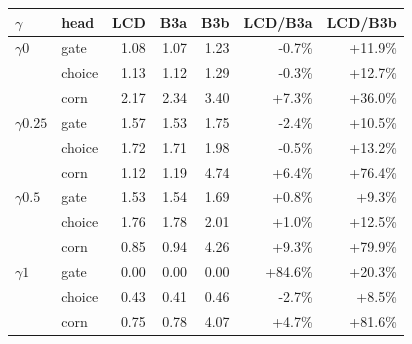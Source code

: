 \begin{tabular}{llrrrrr}
\toprule
$\gamma$ & head & LCD & B3a & B3b & LCD/B3a & LCD/B3b \\
\midrule
$\gamma0$ & gate & 1.08 & 1.07 & 1.23 & -0.7\% & +11.9\% \\
 & choice & 1.13 & 1.12 & 1.29 & -0.3\% & +12.7\% \\
 & corn & 2.17 & 2.34 & 3.40 & +7.3\% & +36.0\% \\
\addlinespace
$\gamma0.25$ & gate & 1.57 & 1.53 & 1.75 & -2.4\% & +10.5\% \\
 & choice & 1.72 & 1.71 & 1.98 & -0.5\% & +13.2\% \\
 & corn & 1.12 & 1.19 & 4.74 & +6.4\% & +76.4\% \\
\addlinespace
$\gamma0.5$ & gate & 1.53 & 1.54 & 1.69 & +0.8\% & +9.3\% \\
 & choice & 1.76 & 1.78 & 2.01 & +1.0\% & +12.5\% \\
 & corn & 0.85 & 0.94 & 4.26 & +9.3\% & +79.9\% \\
\addlinespace
$\gamma1$ & gate & 0.00 & 0.00 & 0.00 & +84.6\% & +20.3\% \\
 & choice & 0.43 & 0.41 & 0.46 & -2.7\% & +8.5\% \\
 & corn & 0.75 & 0.78 & 4.07 & +4.7\% & +81.6\% \\
\bottomrule
\end{tabular}
